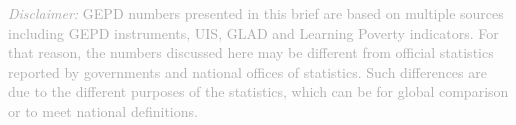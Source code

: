 \documentclass[
]{article}
\begin{document}
{\scriptsize
    \textcolor{darkgray}{\textit{Disclaimer:} GEPD numbers presented in this brief are based on multiple sources including GEPD instruments, UIS, GLAD and Learning Poverty indicators. For that reason, the numbers discussed here may be different from official statistics reported by governments and national offices of statistics. Such differences are due to the different purposes of the statistics, which can be for global comparison or to meet national definitions.}
  }
\end{document}
